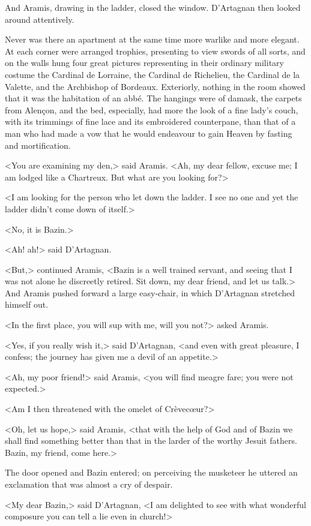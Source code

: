 And Aramis, drawing in the ladder, closed the window. D'Artagnan then looked around attentively.

Never was there an apartment at the same time more warlike and more elegant. At each corner were arranged trophies, presenting to view swords of all sorts, and on the walls hung four great pictures representing in their ordinary military costume the Cardinal de Lorraine, the Cardinal de Richelieu, the Cardinal de la Valette, and the Archbishop of Bordeaux. Exteriorly, nothing in the room showed that it was the habitation of an abbé. The hangings were of damask, the carpets from Alençon, and the bed, especially, had more the look of a fine lady's couch, with its trimmings of fine lace and its embroidered counterpane, than that of a man who had made a vow that he would endeavour to gain Heaven by fasting and mortification.

<You are examining my den,> said Aramis. <Ah, my dear fellow, excuse me; I am lodged like a Chartreux. But what are you looking for?>

<I am looking for the person who let down the ladder. I see no one and yet the ladder didn't come down of itself.>

<No, it is Bazin.>

<Ah! ah!> said D'Artagnan.

<But,> continued Aramis, <Bazin is a well trained servant, and seeing that I was not alone he discreetly retired. Sit down, my dear friend, and let us talk.> And Aramis pushed forward a large easy-chair, in which D'Artagnan stretched himself out.

<In the first place, you will sup with me, will you not?> asked Aramis.

<Yes, if you really wish it,> said D'Artagnan, <and even with great pleasure, I confess; the journey has given me a devil of an appetite.>

<Ah, my poor friend!> said Aramis, <you will find meagre fare; you were not expected.>

<Am I then threatened with the omelet of Crèvecœur?>

<Oh, let us hope,> said Aramis, <that with the help of God and of Bazin we shall find something better than that in the larder of the worthy Jesuit fathers. Bazin, my friend, come here.>

The door opened and Bazin entered; on perceiving the musketeer he uttered an exclamation that was almost a cry of despair.

<My dear Bazin,> said D'Artagnan, <I am delighted to see with what wonderful composure you can tell a lie even in church!>

